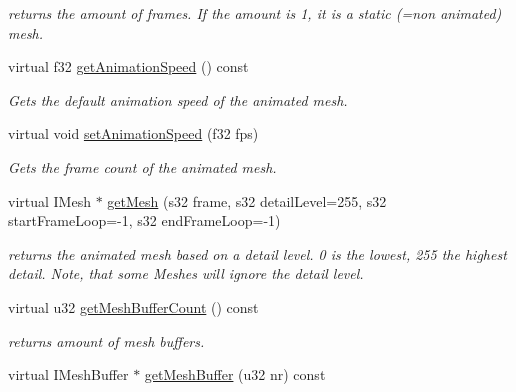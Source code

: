 \begin{DoxyCompactItemize}
\begin{DoxyCompactList}\small\item\em returns the amount of frames. If the amount is 1, it is a static (=non animated) mesh. \end{DoxyCompactList}\item 
virtual f32 \hyperlink{classirr_1_1scene_1_1_c_animated_mesh_m_d2_ab973f8cebb6d6c1809fda6c4898ba4e1}{get\-Animation\-Speed} () const 
\begin{DoxyCompactList}\small\item\em Gets the default animation speed of the animated mesh. \end{DoxyCompactList}\item 
virtual void \hyperlink{classirr_1_1scene_1_1_c_animated_mesh_m_d2_ab60b4e2a74d34717095d5bcb5bfe3441}{set\-Animation\-Speed} (f32 fps)
\begin{DoxyCompactList}\small\item\em Gets the frame count of the animated mesh. \end{DoxyCompactList}\item 
\hypertarget{classirr_1_1scene_1_1_c_animated_mesh_m_d2_aa2c0a2aba29524efc2139b75b25f30c0}{virtual I\-Mesh $\ast$ \hyperlink{classirr_1_1scene_1_1_c_animated_mesh_m_d2_aa2c0a2aba29524efc2139b75b25f30c0}{get\-Mesh} (s32 frame, s32 detail\-Level=255, s32 start\-Frame\-Loop=-\/1, s32 end\-Frame\-Loop=-\/1)}\label{classirr_1_1scene_1_1_c_animated_mesh_m_d2_aa2c0a2aba29524efc2139b75b25f30c0}

\begin{DoxyCompactList}\small\item\em returns the animated mesh based on a detail level. 0 is the lowest, 255 the highest detail. Note, that some Meshes will ignore the detail level. \end{DoxyCompactList}\item 
\hypertarget{classirr_1_1scene_1_1_c_animated_mesh_m_d2_a32cdd44cc53fcef6ddb26570f8faa48b}{virtual u32 \hyperlink{classirr_1_1scene_1_1_c_animated_mesh_m_d2_a32cdd44cc53fcef6ddb26570f8faa48b}{get\-Mesh\-Buffer\-Count} () const }\label{classirr_1_1scene_1_1_c_animated_mesh_m_d2_a32cdd44cc53fcef6ddb26570f8faa48b}

\begin{DoxyCompactList}\small\item\em returns amount of mesh buffers. \end{DoxyCompactList}\item 
\hypertarget{classirr_1_1scene_1_1_c_animated_mesh_m_d2_a2685ccfb1ec6b1b27711ce037e9c3473}{virtual I\-Mesh\-Buffer $\ast$ \hyperlink{classirr_1_1scene_1_1_c_animated_mesh_m_d2_a2685ccfb1ec6b1b27711ce037e9c3473}{get\-Mesh\-Buffer} (u32 nr) const }\label{classirr_1_1scene_1_1_c_animated_mesh_m_d2_a2685ccfb1ec6b1b27711ce037e9c3473}


\end{DoxyCompactItemize}
